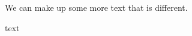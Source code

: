 \documentclass[../main.tex]{subfiles}
\begin{document}
We can make up some more text that is different.






text
\end{document}

